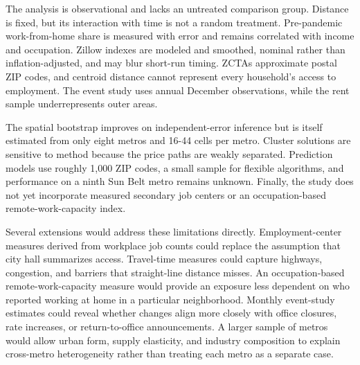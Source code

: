 \documentclass[11pt]{article}
\begin{document}
The analysis is observational and lacks an untreated comparison group. Distance is fixed, but its interaction with time is not a
random treatment. Pre-pandemic work-from-home share is measured with error and remains correlated with income and occupation.
Zillow indexes are modeled and smoothed, nominal rather than inflation-adjusted, and may blur short-run timing. ZCTAs approximate
postal ZIP codes, and centroid distance cannot represent every household's access to employment. The event study uses annual
December observations, while the rent sample underrepresents outer areas.

The spatial bootstrap improves on independent-error inference but is itself estimated from only eight metros and 16-44 cells per
metro. Cluster solutions are sensitive to method because the price paths are weakly separated. Prediction models use roughly 1,000
ZIP codes, a small sample for flexible algorithms, and performance on a ninth Sun Belt metro remains unknown. Finally, the study
does not yet incorporate measured secondary job centers or an occupation-based remote-work-capacity index.

Several extensions would address these limitations directly. Employment-center measures derived from workplace job counts could
replace the assumption that city hall summarizes access. Travel-time measures could capture highways, congestion, and barriers
that straight-line distance misses. An occupation-based remote-work-capacity measure would provide an exposure less dependent on
who reported working at home in a particular neighborhood. Monthly event-study estimates could reveal whether changes align more
closely with office closures, rate increases, or return-to-office announcements. A larger sample of metros would allow urban form,
supply elasticity, and industry composition to explain cross-metro heterogeneity rather than treating each metro as a separate
case.
\end{document}
